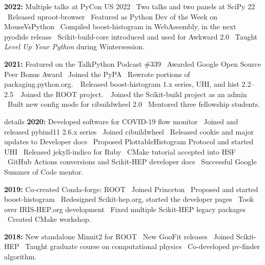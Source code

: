 \documentclass[10pt,letterpaper]{moderncv}
\begin{document}
\textbf{2022:}
Multiple talks at PyCon US 2022 \textbullet\
Two talks and two panels at SciPy 22 \textbullet\
Released uproot-browser \textbullet\
Featured as Python Dev of the Week on MouseVsPython \textbullet\
Compiled boost-histogram in WebAssembly, in the next pyodide release \textbullet\
Scikit-build-core introduced and used for Awkward 2.0 \textbullet\
Taught \emph{Level Up Your Python} during Wintersession.

\textbf{2021:}
Featured on the TalkPython Podcast \#339 \textbullet\
Awarded Google Open Source Peer Bonus Award \textbullet\
Joined the PyPA \textbullet\ Rewrote portions of packaging.python.org.\ \textbullet\
Released boost-histogram 1.x series, UHI, and hist 2.2--2.5\ \textbullet\
Joined the ROOT project.\ \textbullet\
Joined the Scikit-build project as an admin \textbullet\
Built new config mode for cibuildwheel 2.0 \textbullet\
Mentored three fellowship students.

\begin{taggedblock}{details}
\textbf{2020:}
Developed software for COVID-19 flow monitor \textbullet\
Joined and released pybind11 2.6.x series \textbullet\
Joined cibuildwheel \textbullet\
Released cookie and major updates to Developer docs \textbullet\
Proposed PlottableHistogram Protocol and started UHI \textbullet\
Released jekyll-indico for Ruby \textbullet\
CMake tutorial accepted into HSF \textbullet\
GitHub Actions conversions and Scikit-HEP developer docs \textbullet\
Successful Google Summer of Code mentor.

\textbf{2019:}
Co-created Conda-forge: ROOT \textbullet\
Joined Princeton \textbullet\
Proposed and started boost-histogram \textbullet\
Redesigned Scikit-hep.org, started the developer pages \textbullet\
Took over IRIS-HEP.org development \textbullet\
Fixed multiple Scikit-HEP legacy packages \textbullet\ Created CMake workshop.

\textbf{2018:} New standalone Minuit2 for ROOT \textbullet\
New GooFit releases \textbullet\
Joined Scikit-HEP \textbullet\
Taught graduate course on computational physics \textbullet\
Co-developed pv-finder algorithm.
\end{taggedblock}

\mysection{Other writings}
\end{document}
